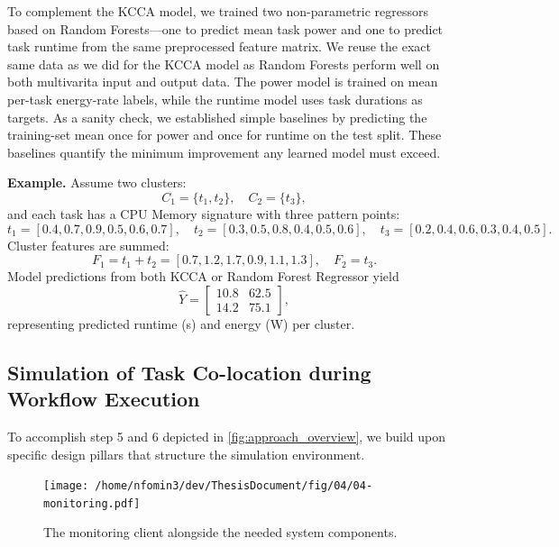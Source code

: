 To complement the KCCA model, we trained two non-parametric regressors based on Random Forests—one to predict mean task power and one to predict task runtime from the same preprocessed feature matrix. We reuse the exact same data as we did for the KCCA model as Random Forests perform well on both multivarita input and output data. The power model is trained on mean per-task energy-rate labels, while the runtime model uses task durations as targets. As a sanity check, we established simple baselines by predicting the training-set mean once for power and once for runtime on the test split. These baselines quantify the minimum improvement any learned model must exceed.


\textbf{Example.}
Assume two clusters:
\[
    C_1 = \{t_1, t_2\}, \quad C_2 = \{t_3\},
\]
and each task has a CPU Memory signature with three pattern points:
\[
    t_1 = [0.4, 0.7, 0.9, 0.5, 0.6, 0.7], \quad
    t_2 = [0.3, 0.5, 0.8, 0.4, 0.5, 0.6], \quad
    t_3 = [0.2, 0.4, 0.6, 0.3, 0.4, 0.5].
\]
Cluster features are summed:
\[
    F_1 = t_1 + t_2 = [0.7, 1.2, 1.7, 0.9, 1.1, 1.3], \quad
    F_2 = t_3.
\]
Model predictions from both KCCA or Random Forest Regressor yield
\[
    \hat{Y} =
    \begin{bmatrix}
        10.8 & 62.5 \\
        14.2 & 75.1
    \end{bmatrix},
\]
representing predicted runtime (s) and energy (W) per cluster.

\subsection{Simulation of Task Co-location during Workflow Execution}
\label{sec:simulation_environment}

\label{sec:design_pillars}

To accomplish step 5 and 6 depicted in \ref{fig:approach_overview}, we build upon specific design pillars that structure the simulation environment.

\begin{figure}[htbp]
    \centering
    \texttt{[image: /home/nfomin3/dev/ThesisDocument/fig/04/04-monitoring.pdf]} %
    \caption{The monitoring client alongside the needed system components.}
    \label{fig:monitoring_client}
\end{figure}

